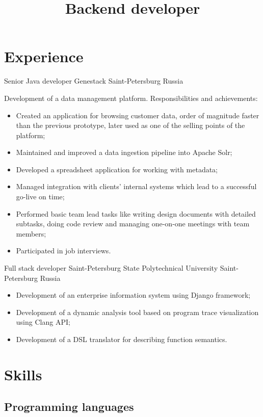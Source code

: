 \documentclass{moderncv}
\title{Backend developer}
\begin{document}
\makecvtitle

\section{Experience}

		{Senior Java developer}
		{Genestack}
		{Saint-Petersburg}
		{Russia}
		{Development of a data management platform. \newline{} Responsibilities and achievements:
		\begin{itemize}
			\item Created an application for browsing customer data, order of magnitude faster than the previous prototype, later
			used as one of the selling points of the platform;
			\item Maintained and improved a data ingestion pipeline into Apache Solr;
			\item Developed a spreadsheet application for working with metadata;
			\item Managed integration with clients' internal systems which lead to a successful go-live on time;
			\item Performed basic team lead tasks like writing design documents with detailed subtasks, doing code review 
			and managing one-on-one meetings with team members;   
  			\item Participated in job interviews.
		\end{itemize}}

		{Full stack developer}
		{Saint-Petersburg State Polytechnical University}
		{Saint-Petersburg}
		{Russia}
		{\begin{itemize}
			\item Development of an enterprise information system using Django framework;
			\item Development of a dynamic analysis tool based on program trace visualization using Clang API;
  			\item Development of a DSL translator for describing function semantics.
		\end{itemize}}

\section{Skills}

\subsection{Programming languages}
\end{document}
